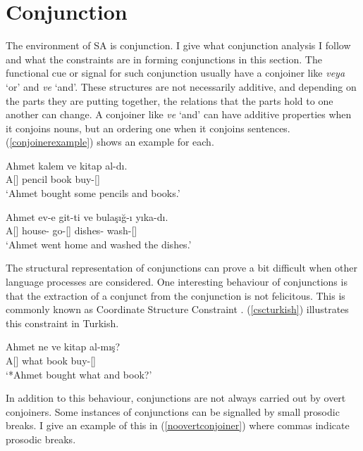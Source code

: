 \section{Conjunction}

The environment of SA is conjunction. I give what conjunction analysis I follow and what the constraints are in forming conjunctions in this section. The functional cue or signal for such conjunction usually have a conjoiner like \textit{veya} `or' and \textit{ve} `and'. These structures are not necessarily additive, and depending on the parts they are putting together, the relations that the parts hold to one another can change. A conjoiner like \textit{ve} `and' can have additive properties when it conjoins nouns, but an ordering one when it conjoins sentences. (\ref{conjoinerexample}) shows an example for each.

\begin{exe}
\ex \label{conjoinerexample}
\begin{xlist}
\ex \gll Ahmet kalem ve kitap al-dı. \\
A[{\Nom}] pencil {\And} book buy-{\Pst}[{\Tsg}] \\
\glt `Ahmet bought some pencils and books.'

\ex \gll Ahmet ev-e git-ti ve bulaşığ-ı yıka-dı. \\
A[{\Nom}] house-{\Dat} go-{\Pst}[{\Tsg}] {\And} dishes-{\Acc} wash-{\Pst}[{\Tsg}] \\
\glt `Ahmet went home and washed the dishes.'
\end{xlist}
\end{exe}

The structural representation of conjunctions can prove a bit difficult when other language processes are considered. One interesting behaviour of conjunctions is that the extraction of a conjunct from the conjunction is not felicitous. This is commonly known as Coordinate Structure Constraint \citep{ross1967constraints}. (\ref{cscturkish}) illustrates this constraint in Turkish.

\begin{exe}
\ex \label{cscturkish} 
\gll *Ahmet ne ve kitap al-mış? \\ 
A[{\Nom}] what {\And} book buy-{\Pst}[{\Tsg}] \\
\glt `*Ahmet bought what and book?'
\end{exe}

In addition to this behaviour, conjunctions are not always carried out by overt conjoiners. Some instances of conjunctions can be signalled by small prosodic breaks. I give an example of this in (\ref{noovertconjoiner}) where commas indicate prosodic breaks.

